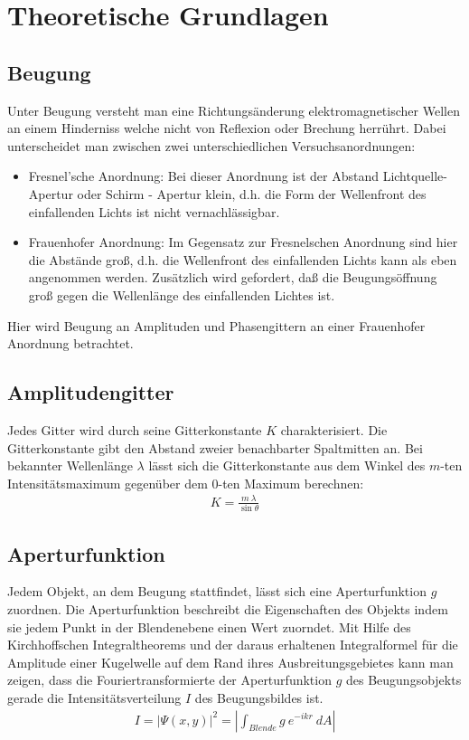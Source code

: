 \documentclass[12pt]{article}
\begin{document}
\section{Theoretische Grundlagen}

\subsection{Beugung}
Unter Beugung versteht man eine Richtungsänderung elektromagnetischer Wellen an einem Hinderniss welche nicht von Reflexion oder Brechung herrührt. Dabei unterscheidet man zwischen zwei unterschiedlichen Versuchsanordnungen:
\begin{itemize}
 \item Fresnel’sche Anordnung: Bei dieser Anordnung ist der Abstand Lichtquelle-Apertur oder Schirm - Apertur klein, d.h. die Form der Wellenfront des einfallenden Lichts ist nicht vernachlässigbar.
 \item Frauenhofer Anordnung: Im Gegensatz zur Fresnelschen Anordnung sind hier die Abstände groß, d.h. die Wellenfront des einfallenden Lichts kann als eben angenommen werden. Zusätzlich wird gefordert, daß die Beugungsöffnung groß gegen die Wellenlänge des einfallenden Lichtes ist.
\end{itemize}
Hier wird Beugung an Amplituden und Phasengittern an einer Frauenhofer Anordnung betrachtet.

\subsection{Amplitudengitter}
Jedes Gitter wird durch seine Gitterkonstante $K$ charakterisiert. Die Gitterkonstante gibt den Abstand zweier benachbarter Spaltmitten an.
Bei bekannter Wellenlänge $\lambda$ lässt sich die Gitterkonstante aus dem Winkel des $m$-ten Intensitätsmaximum gegenüber dem 0-ten Maximum berechnen:
\begin{align}
\label{gitterkonstante} K = \frac{m \ \lambda}{\sin{\theta}}
\end{align}

\subsection{Aperturfunktion}
Jedem Objekt, an dem Beugung stattfindet, lässt sich eine Aperturfunktion $g$ zuordnen. Die Aperturfunktion beschreibt die Eigenschaften des Objekts indem
sie jedem Punkt in der Blendenebene einen Wert zuorndet. Mit Hilfe des Kirchhoffschen Integraltheorems und der daraus erhaltenen Integralformel für die
Amplitude einer Kugelwelle auf dem Rand ihres Ausbreitungsgebietes kann man zeigen, dass die Fouriertransformierte der Aperturfunktion $g$ des
Beugungsobjekts gerade die Intensitätsverteilung $I$ des Beugungsbildes ist.
\begin{align}
 I = \lvert \Psi(x,y) \rvert^2 = \left\lvert \int_{Blende}{g \ e^{-ikr} \ dA} \right\rvert
\end{align}
\end{document}
